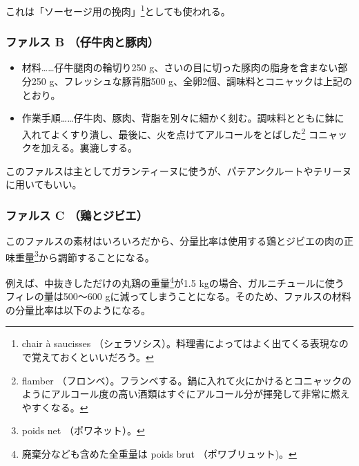 \begin{recette}
これは「\protect\hypertarget{chair-a-saucisse}{ソーセージ用の挽肉}」\footnote{chair
  à saucisses
  （シェラソシス）。料理書によってはよく出てくる表現なので覚えておくといいだろう。}としても使われる。\label{chair-a-saucisse}

\hypertarget{farce-froide-b}{%
\subsubsection{ファルス B （仔牛肉と豚肉）}\label{farce-froide-b}}



\begin{itemize}
\item
  材料\ldots{}\ldots{}仔牛腿肉の輪切り250
  g、さいの目に切った豚肉の脂身を含まない部分250
  g、フレッシュな豚背脂500
  g、全卵2個、調味料とコニャックは上記のとおり。
\item
  作業手順\ldots{}\ldots{}仔牛肉、豚肉、背脂を別々に細かく刻む。調味料とともに鉢に入れてよくすり潰し、最後に、火を点けてアルコールをとばした\footnote{flamber
    （フロンベ）。フランベする。鍋に入れて火にかけるとコニャックのようにアルコール度の高い酒類はすぐにアルコール分が揮発して非常に燃えやすくなる。}
  コニャックを加える。裏漉しする。
\end{itemize}

このファルスは主としてガランティーヌに使うが、パテアンクルートやテリーヌに用いてもいい。

\hypertarget{farce-froide-c}{%
\subsubsection{ファルス C （鶏とジビエ）}\label{farce-froide-c}}



このファルスの素材はいろいろだから、分量比率は使用する鶏とジビエの肉の正味重量\footnote{poids
  net （ポワネット）。}から調節することになる。

例えば、中抜きしただけの丸鶏の重量\footnote{廃棄分なども含めた全重量は
  poids brut （ポワブリュット)。}が1.5
kgの場合、ガルニチュールに使うフィレの量は500〜600
gに減ってしまうことになる。そのため、ファルスの材料の分量比率は以下のようになる。


\end{recette}
